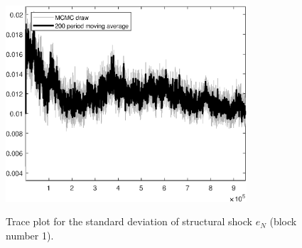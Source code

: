 \begin{figure}[H]
\centering
  \includegraphics[width=0.8\textwidth]{BRS_growth_util_sectoral/graphs/TracePlot_SE_e_N_blck_1}\\
    \caption{Trace plot for the standard deviation of structural shock ${e_N}$ (block number 1).}
\end{figure}
